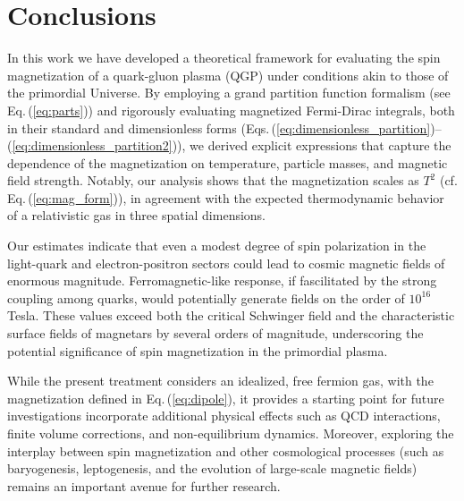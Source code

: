 \documentclass[epjST]{svjour}
\newcommand{\req}[1]{Eq.\,(\ref{#1})}
\begin{document}
\section{Conclusions}
\label{sec:conclusions}
In this work we have developed a theoretical framework for evaluating the spin magnetization of a quark-gluon plasma (QGP) under conditions akin to those of the primordial Universe. By employing a grand partition function formalism (see \req{eq:parts}) and rigorously evaluating magnetized Fermi-Dirac integrals, both in their standard and dimensionless forms (Eqs.\,(\ref{eq:dimensionless_partition})--(\ref{eq:dimensionless_partition2})), we derived explicit expressions that capture the dependence of the magnetization on temperature, particle masses, and magnetic field strength. Notably, our analysis shows that the magnetization scales as \(T^2\) (cf. \req{eq:mag_form}), in agreement with the expected thermodynamic behavior of a relativistic gas in three spatial dimensions.

Our estimates indicate that even a modest degree of spin polarization in the light-quark and electron-positron sectors could lead to cosmic magnetic fields of enormous magnitude. Ferromagnetic-like response, if fascilitated by the strong coupling among quarks, would potentially generate fields on the order of \(10^{16}\) Tesla. These values exceed both the critical Schwinger field and the characteristic surface fields of magnetars by several orders of magnitude, underscoring the potential significance of spin magnetization in the primordial plasma.

While the present treatment considers an idealized, free fermion gas, with the magnetization defined in \req{eq:dipole}, it provides a starting point for future investigations incorporate additional physical effects such as QCD interactions, finite volume corrections, and non-equilibrium dynamics. Moreover, exploring the interplay between spin magnetization and other cosmological processes (such as baryogenesis, leptogenesis, and the evolution of large-scale magnetic fields) remains an important avenue for further research.



\end{document}

